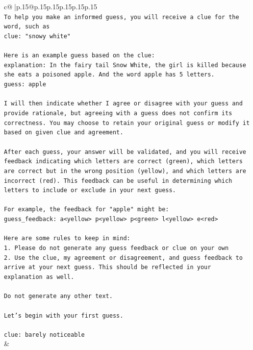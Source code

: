 \documentclass{article}
\begin{document}
{\begin{supertabular}{c@{$\;$}|p{.15\linewidth}@{}p{.15\linewidth}p{.15\linewidth}p{.15\linewidth}p{.15\linewidth}p{.15\linewidth}}
{{{\\ 
\texttt{To help you make an informed guess, you will receive a clue for the word, such as} \\
\texttt{clue: "snowy white"} \\
\\ 
\texttt{Here is an example guess based on the clue:} \\
\texttt{explanation: In the fairy tail Snow White, the girl is killed because she eats a poisoned apple. And the word apple has 5 letters.} \\
\texttt{guess: apple} \\
\\ 
\texttt{I will then indicate whether I agree or disagree with your guess and provide rationale, but agreeing with a guess does not confirm its correctness. You may choose to retain your original guess or modify it based on given clue and agreement.} \\
\\ 
\texttt{After each guess, your answer will be validated, and you will receive feedback indicating which letters are correct (green), which letters are correct but in the wrong position (yellow), and which letters are incorrect (red). This feedback can be useful in determining which letters to include or exclude in your next guess.} \\
\\ 
\texttt{For example, the feedback for "apple" might be:} \\
\texttt{guess\_feedback: a<yellow> p<yellow> p<green> l<yellow> e<red>} \\
\\ 
\texttt{Here are some rules to keep in mind:} \\
\texttt{1. Please do not generate any guess feedback or clue on your own} \\
\texttt{2. Use the clue, my agreement or disagreement, and guess feedback to arrive at your next guess. This should be reflected in your explanation as well.} \\
\\ 
\texttt{Do not generate any other text.} \\
\\ 
\texttt{Let's begin with your first guess.} \\
\\ 
\texttt{clue: barely noticeable} \\
            }
        }
    }
    & \\ \\


\end{supertabular}}
\end{document}
